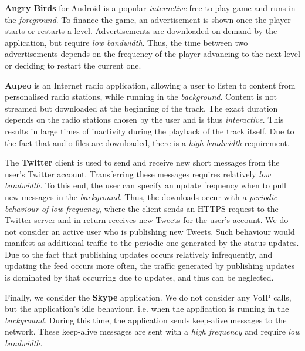 \textbf{Angry Birds} for Android is a popular \emph{interactive} free-to-play game and runs in the \emph{foreground}.
To finance the game, an advertisement is shown once the player starts or restarts a level.
Advertisements are downloaded on demand by the application, but require \emph{low bandwidth}.
Thus, the time between two advertisements depends on the frequency of the player advancing to the next level or deciding to restart the current one.

\textbf{Aupeo} is an Internet radio application, allowing a user to listen to content from personalised radio stations, while running in the \emph{background}.
Content is not streamed but downloaded at the beginning of the track.
The exact duration depends on the radio stations chosen by the user and is thus \emph{interactive}.
This results in large times of inactivity during the playback of the track itself.
Due to the fact that audio files are downloaded, there is a \emph{high bandwidth} requirement.

The \textbf{Twitter} client is used to send and receive new short messages from the user's Twitter account.
Transferring these messages requires relatively \emph{low bandwidth}.
To this end, the user can specify an update frequency when to pull new messages in the \emph{background}.
Thus, the downloads occur with a \emph{periodic behaviour of low frequency}, where
the client sends an \gls{HTTPS} request to the Twitter server and in return receives new Tweets for the user's account.
We do not consider an active user who is publishing new Tweets.
Such behaviour would manifest as additional traffic to the periodic one generated by the status updates.
Due to the fact that publishing updates occurs relatively infrequently, and updating the feed occurs more often, the traffic generated by publishing updates is dominated by that occurring due to updates, and thus can be neglected.

Finally, we consider the \textbf{Skype} application.
We do not consider any \gls{VoIP} calls, but the application's idle behaviour, i.e. when the application is running in the \emph{background}.
During this time, the application sends keep-alive messages to the network.
These keep-alive messages are sent with a \emph{high frequency} and require \emph{low bandwidth}.

